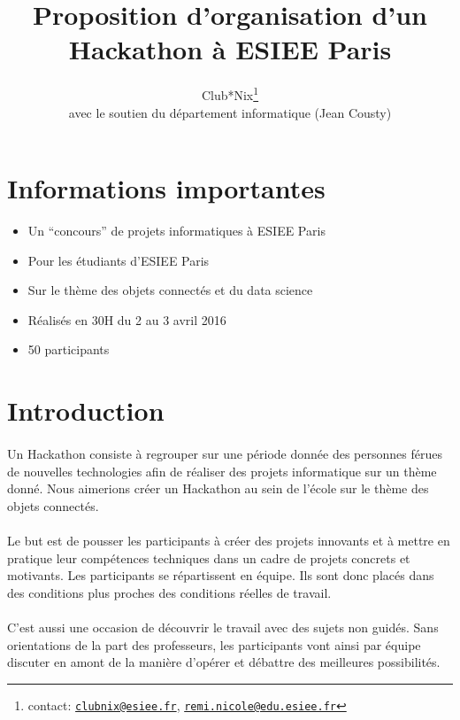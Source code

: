 \documentclass{article}
\title{Proposition d'organisation d'un Hackathon à ESIEE Paris}
\author{Club*Nix\footnote{contact:
		\texttt{\href{mailto:clubnix@esiee.fr}{clubnix@esiee.fr}},
		\texttt{\href{mailto:remi.nicole@edu.esiee.fr}{remi.nicole@edu.esiee.fr}}}\\
	avec le soutien du département informatique (Jean Cousty)}
\begin{document}
\maketitle

\section{Informations importantes}

\begin{itemize}
	\item Un ``concours'' de projets informatiques à ESIEE Paris
	\item Pour les étudiants d'ESIEE Paris
	\item Sur le thème des objets connectés et du data science
	\item Réalisés en 30H du 2 au 3 avril 2016
	\item 50 participants
\end{itemize}

\section{Introduction}

\paragraph{}
Un Hackathon consiste à regrouper sur une période donnée des personnes férues
de nouvelles technologies afin de réaliser des projets informatique sur un
thème donné. Nous aimerions créer un Hackathon au sein de l'école sur le thème
des objets connectés.

\paragraph{}
Le but est de pousser les participants à créer des projets innovants et à
mettre en pratique leur compétences techniques dans un cadre de projets
concrets et motivants. Les participants se répartissent en équipe. Ils sont
donc placés dans des conditions plus proches des conditions réelles de travail.

\paragraph{}
C'est aussi une occasion de découvrir le travail avec des sujets non guidés.
Sans orientations de la part des professeurs, les participants vont ainsi par
équipe discuter en amont de la manière d'opérer et débattre des meilleures
possibilités.
\end{document}
